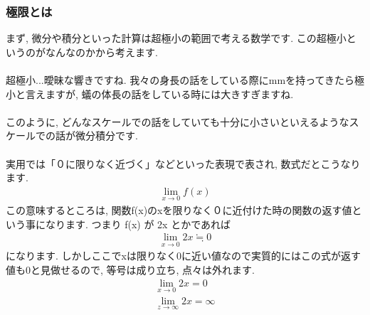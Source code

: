 \documentclass[11pt,a4paper]{jsarticle}
\begin{document}
\subsubsection{極限とは}
まず, 微分や積分といった計算は超極小の範囲で考える数学です. この超極小というのがなんなのかから考えます.\\
\\
超極小...曖昧な響きですね. 我々の身長の話をしている際にmmを持ってきたら極小と言えますが, 蟻の体長の話をしている時には大きすぎますね. \\
\\
このように, どんなスケールでの話をしていても十分に小さいといえるようなスケールでの話が微分積分です.\\
\\
実用では「０に限りなく近づく」などといった表現で表され, 数式だとこうなります.
\begin{eqnarray}
\lim_{x\to0} f(x)
\end{eqnarray}
この意味するところは, 関数f(x)のxを限りなく０に近付けた時の関数の返す値という事になります. つまり f(x) が 2x とかであれば
\begin{eqnarray}
\lim_{x\to0} 2x ≒ 0
\end{eqnarray}
になります. しかしここでxは限りなく0に近い値なので実質的にはこの式が返す値も0と見做せるので, 等号は成り立ち, 点々は外れます.
\begin{eqnarray}
\lim_{x\to0} 2x = 0\\
\lim_{z\to\infty} 2x = \infty
\end{eqnarray}
\end{document}
